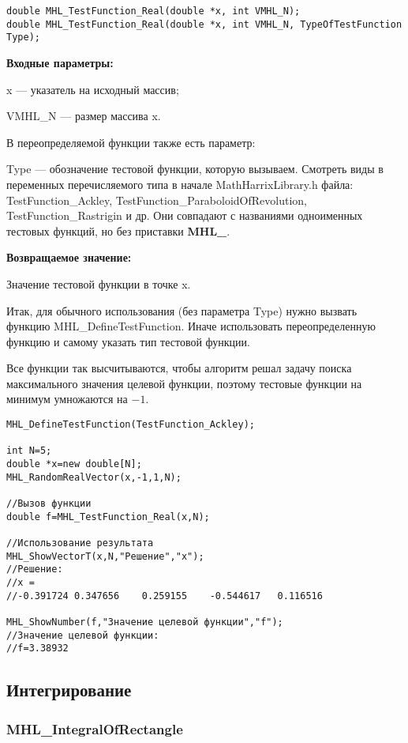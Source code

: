 \documentclass[a4paper,12pt]{article}
\begin{document}
\begin{lstlisting}[label=code_syntax_MHL_TestFunction_Real,caption=Синтаксис]
double MHL_TestFunction_Real(double *x, int VMHL_N);
double MHL_TestFunction_Real(double *x, int VMHL_N, TypeOfTestFunction Type);
\end{lstlisting}

\textbf{Входные параметры:}

x --- указатель на исходный массив;

VMHL\_N --- размер массива x.

В переопределяемой функции также есть параметр:
  
Type --- обозначение тестовой функции, которую вызываем.
Смотреть виды в переменных перечисляемого типа в начале MathHarrixLibrary.h файла: TestFunction\_Ackley, TestFunction\_ParaboloidOfRevolution, TestFunction\_Rastrigin и др. Они совпадают с названиями одноименных тестовых функций, но без приставки \textbf{MHL\_}.

\textbf{Возвращаемое значение:}
 
Значение тестовой функции в точке x.

Итак, для обычного использования (без параметра Type) нужно вызвать функцию MHL\_DefineTestFunction. Иначе использовать переопределенную функцию и самому указать тип тестовой функции.

Все функции так высчитываются, чтобы алгоритм решал задачу поиска максимального значения целевой функции, поэтому тестовые функции на минимум умножаются на $-1$.


\begin{lstlisting}[label=code_use_MHL_TestFunction_Real,caption=Пример использования]
MHL_DefineTestFunction(TestFunction_Ackley);

int N=5;
double *x=new double[N];
MHL_RandomRealVector(x,-1,1,N);

//Вызов функции
double f=MHL_TestFunction_Real(x,N);

//Использование результата
MHL_ShowVectorT(x,N,"Решение","x");
//Решение:
//x =
//-0.391724	0.347656	0.259155	-0.544617	0.116516

MHL_ShowNumber(f,"Значение целевой функции","f");
//Значение целевой функции:
//f=3.38932
\end{lstlisting}

\subsection{Интегрирование}

\subsubsection{MHL\_IntegralOfRectangle}\label{MHL_IntegralOfRectangle}
\end{document}
